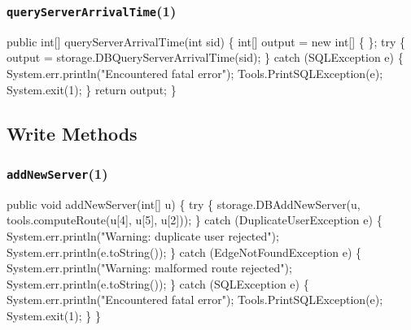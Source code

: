 \documentclass{article}
\def\nwendcode{\endtrivlist \endgroup}      %
\let\nwdocspar=\par
\begin{document}
\subsubsection{{\tt{}\protect{}queryServerArrivalTime}(1)}
\nwenddocs{}\plusendmoddef
public int[] queryServerArrivalTime(int sid) \{
  int[] output = new int[] \{ \};
  try \{
    output = storage.DBQueryServerArrivalTime(sid);
  \} catch (SQLException e) \{
    System.err.println("Encountered fatal error");
    Tools.PrintSQLException(e);
    System.exit(1);
  \}
  return output;
\}
\eatline
{}\nwendcode{}\nwdocspar

\subsection{Write Methods}
\subsubsection{{\tt{}\protect{}addNewServer}(1)}
\nwenddocs{}\endmoddef{}
public void addNewServer(int[] u) \{
  try \{
    storage.DBAddNewServer(u, tools.computeRoute(u[4], u[5], u[2]));
  \} catch (DuplicateUserException e) \{
    System.err.println("Warning: duplicate user rejected");
    System.err.println(e.toString());
  \} catch (EdgeNotFoundException e) \{
    System.err.println("Warning: malformed route rejected");
    System.err.println(e.toString());
  \} catch (SQLException e) \{
    System.err.println("Encountered fatal error");
    Tools.PrintSQLException(e);
    System.exit(1);
  \}
\}
\eatline
{}\nwendcode{}\nwdocspar
\end{document}
